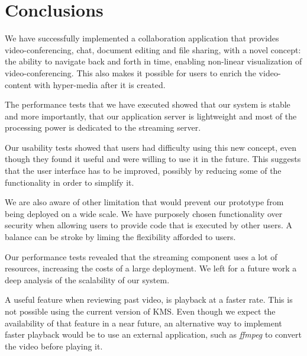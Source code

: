 \documentclass[10pt,conference]{IEEEtran}
\begin{document}
\section{Conclusions}
\label{chapter:conclusion}

We have successfully implemented a collaboration application that provides video-conferencing, chat, document editing and file sharing, with a novel concept: the ability to navigate back and forth in time, enabling non-linear visualization of video-conferencing.
This also makes it possible for users to enrich the video-content with hyper-media after it is created.

The performance tests that we have executed showed that our system is stable and more importantly, that our application server is lightweight and most of the processing power is dedicated to the streaming server.

Our usability tests showed that users had difficulty using this new concept, even though they found it useful and were willing to use it in the future.
This suggests that the user interface has to be improved, possibly by reducing some of the functionality in order to simplify it.

We are also aware of other limitation that would prevent our prototype from being deployed on a wide scale.
We have purposely chosen functionality over security when allowing users to provide code that is executed by other users.
A balance can be stroke by liming the flexibility afforded to users.

Our performance tests revealed that the streaming component uses a lot of resources, increasing the costs of a large deployment.
We left for a future work a deep analysis of the scalability of our system.

A useful feature when reviewing past video, is playback at a faster rate.
This is not possible using the current version of \gls{KMS}.
Even though we expect the availability of that feature in a near future, an alternative way to implement faster playback would be to use an external application, such as \emph{ffmpeg} to convert the video before playing it.








\end{document}
